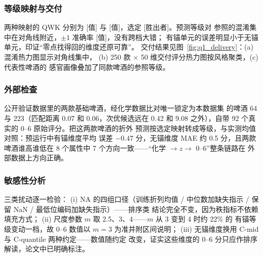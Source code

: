 \documentclass[12pt,a4paper]{article}
\begin{document}
\subsubsection{等级映射与交付}

两种映射的 QWK 分别为 [值] 与 [值]，选定 [胜出者]。预测等级对
参照的混淆集中在对角线附近，$\pm1$ 准确率 [值]，没有跨档大错；
有锚单元的误差明显小于无锚单元，印证``零点找得回的维度还原可靠''。
交付结果见图~\ref{fig:q1_delivery}：(a) 混淆热力图显示对角线集中，
(b) 250 款 $\times$ 50 维交付评分热力图按风格聚类，(c) 代表性啤酒的
感官画像叠加了同款啤酒的参照等级。


\subsubsection{外部检查}

公开验证数据里的两款基础啤酒，经化学数据比对唯一锁定为本数据集
的啤酒 64 与 223（匹配距离 0.07 和 0.06，次优候选远在 0.42 和
9.08 之外），自带 92 个真实的 0--6 原始评分。把这两款啤酒的折外
预测按选定映射转成等级，与实测均值对照：预运行中有锚维度平均
误差 $-0.47$ 分，无锚维度 MAE 约 0.5 分，且两款啤酒谁高谁低在
8 个属性中 7 个方向一致——``化学 $\to z\to$ 0--6''整条链路在
外部数据上方向正确。

\subsubsection{敏感性分析}

三类扰动逐一检验：
(i) NA 的四组口径（训练折列均值 / 中位数加缺失指示 / 保留 NaN /
最低位编码加缺失指示）——排序类
结论完全不变，因为秩指标不依赖填充方式；
(ii) 尺度参数 $m$ 取 2.5、3、4——$m$ 从 3 变到 4 时约 22\% 的
有锚等级变动一档，故 0--6 数值以 $m=3$ 为准并附区间说明；
(iii) 无锚维度换用 C-mid 与 C-quantile 两种约定——数值随约定
改变，证实这些维度的 0--6 分只应作排序解读，论文中已明确标注。

\end{document}
